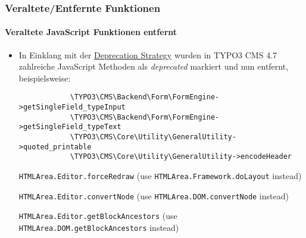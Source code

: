 \begin{frame}[fragile]
	\frametitle{Veraltete/Entfernte Funktionen}
	\framesubtitle{Veraltete JavaScript Funktionen entfernt}

	\begin{itemize}
		\item In Einklang mit der \href{http://forge.typo3.org/projects/typo3v4-core/wiki/CoreDevPolicy}{Deprecation Strategy}
			wurden in TYPO3 CMS 4.7 zahlreiche JavaScript Methoden als \textit{deprecated} markiert und nun entfernt, beispielsweise:

		\begin{lstlisting}
			\TYPO3\CMS\Backend\Form\FormEngine->getSingleField_typeInput
			\TYPO3\CMS\Backend\Form\FormEngine->getSingleField_typeText
			\TYPO3\CMS\Core\Utility\GeneralUtility->quoted_printable
			\TYPO3\CMS\Core\Utility\GeneralUtility->encodeHeader
		\end{lstlisting}

		\smaller
			\texttt{HTMLArea.Editor.forceRedraw}\newline
				(use \texttt{HTMLArea.Framework.doLayout} instead)
				\vspace{0.2cm}

			\texttt{HTMLArea.Editor.convertNode}\newline
				(use \texttt{HTMLArea.DOM.convertNode} instead)
				\vspace{0.2cm}

			\texttt{HTMLArea.Editor.getBlockAncestors}\newline
				(use \texttt{HTMLArea.DOM.getBlockAncestors} instead)
		\normalsize

	\end{itemize}

\end{frame}



